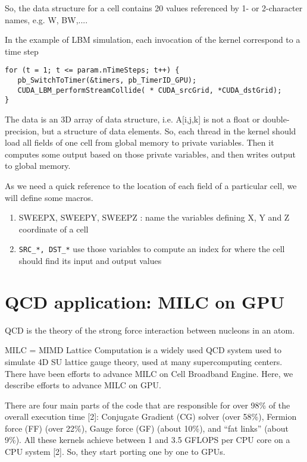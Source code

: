 So, the data structure for a cell contains 20 values referenced by 1-
or 2-character names, e.g. W, BW,....


In the example of LBM simulation, each invocation of the kernel
correspond to a time step
\begin{lstlisting}
for (t = 1; t <= param.nTimeSteps; t++) {
   pb_SwitchToTimer(&timers, pb_TimerID_GPU);
   CUDA_LBM_performStreamCollide( * CUDA_srcGrid, *CUDA_dstGrid);
}
\end{lstlisting}
The data is an 3D array of data structure, i.e. A[i,j,k] is not a
float or double-precision, but a structure of data elements. So, each
thread in the kernel should load all fields of one cell from global
memory to private variables. Then it computes some output based on
those private variables, and then writes output to global memory. 


As we need a quick reference to the location of each field of a
particular cell, we will define some macros. 
\begin{enumerate}
\item SWEEPX, SWEEPY, SWEEPZ : name the variables defining X, Y and Z
  coordinate of a cell
\item \verb!SRC_*, DST_*! use those variables to compute an index for
  where the cell should find its input and output values 
\end{enumerate}



\section{QCD application: MILC on GPU}
\label{sec:qcd-application}

QCD is the theory of the strong force interaction between nucleons in
an atom.  

MILC = MIMD Lattice Computation is a widely used QCD system used to
simulate 4D SU lattice gauge theory, used at many supercomputing
centers. There have been efforts to advance MILC on Cell Broadband
Engine. Here, we describe efforts to advance MILC on GPU.



There are four main parts of the code that are responsible for over
98\% of the overall execution time [2]: Conjugate Gradient (CG) solver
(over 58\%), Fermion force (FF) (over 22\%), Gauge force (GF) (about
10\%), and ``fat links'' (about 9\%). All these kernels achieve between
1 and 3.5 GFLOPS per CPU core on a CPU system [2].  So, they start
porting one by one to GPUs.


